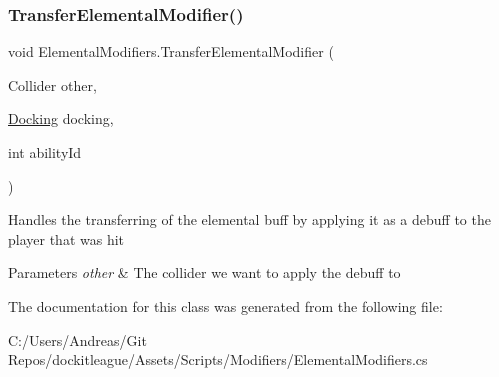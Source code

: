 \subsubsection{\texorpdfstring{Transfer\+Elemental\+Modifier()}{TransferElementalModifier()}}
{\footnotesize\ttfamily void Elemental\+Modifiers.\+Transfer\+Elemental\+Modifier (\begin{DoxyParamCaption}\item[{Collider}]{other,  }\item[{\hyperlink{class_docking}{Docking}}]{docking,  }\item[{int}]{ability\+Id }\end{DoxyParamCaption})}



Handles the transferring of the elemental buff by applying it as a debuff to the player that was hit 


\begin{DoxyParams}{Parameters}
{\em other} & The collider we want to apply the debuff to\\
\hline
\end{DoxyParams}


The documentation for this class was generated from the following file\+:\begin{DoxyCompactItemize}
\item 
C\+:/\+Users/\+Andreas/\+Git Repos/dockitleague/\+Assets/\+Scripts/\+Modifiers/Elemental\+Modifiers.\+cs\end{DoxyCompactItemize}
